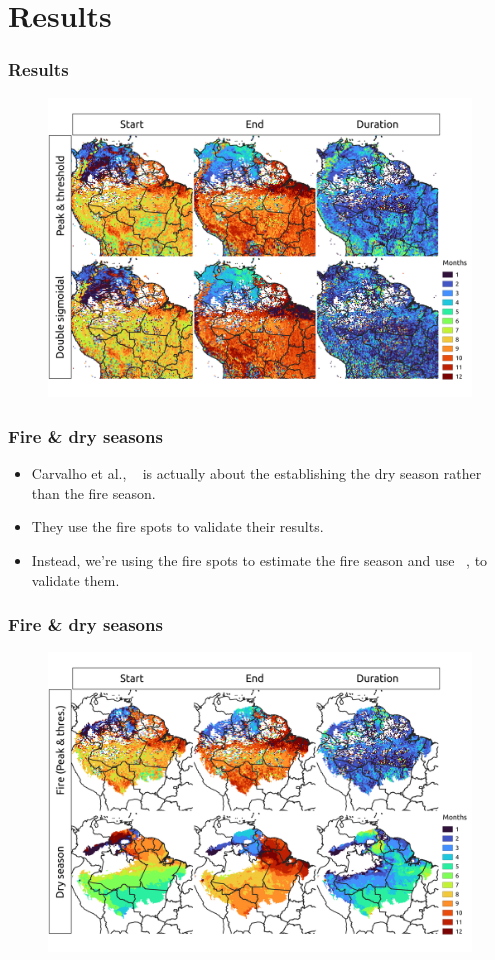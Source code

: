 \documentclass[aspectratio=169]{beamer}
\begin{document}
\section{Results}

\begin{frame}
    \frametitle{Results}
    \begin{figure}[h]
        \includegraphics[width=0.80\linewidth]
        {./images/pthres_vs_dsig.png}
    \end{figure}
\end{frame}

\begin{frame}
    \frametitle{Fire \& dry seasons}
    \begin{itemize}
        \item Carvalho et al., ~\cite{carvalho2021} is actually about the
            establishing the dry season rather than the fire season.
        \item They use the fire spots to validate their results.
        \item Instead, we're using the fire spots to estimate the fire season
            and use ~\cite{carvalho2021}, to validate them.
    \end{itemize}
\end{frame}

\begin{frame}
    \frametitle{Fire \& dry seasons}
    \begin{figure}[h]
        \includegraphics[width=0.80\linewidth]
        {./images/pthres_vs_carvalho2021.png}
    \end{figure}
\end{frame}
\end{document}
